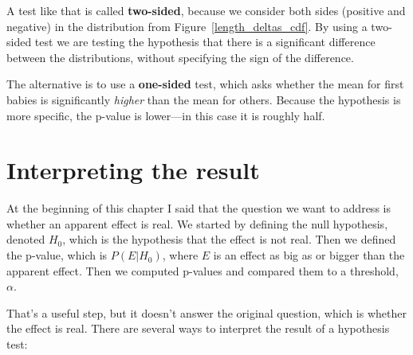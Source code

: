 \documentclass[12pt]{book}
\begin{document}

A test like that is called {\bf two-sided}, because we consider both
sides (positive and negative) in the distribution from
Figure~\ref{length_deltas_cdf}.  By using a two-sided test we are
testing the hypothesis that there is a significant difference between
the distributions, without specifying the sign of the difference.


The alternative is to use a {\bf one-sided} test, which asks whether
the mean for first babies is significantly {\em higher} than
the mean for others.  Because the hypothesis is more specific, the
p-value is lower---in this case it is roughly half.


\section{Interpreting the result}

At the beginning of this chapter I said that the question we want to
address is whether an apparent effect is real.  We started by defining
the null hypothesis, denoted $H_0$, which is the
hypothesis that the effect is not real.  Then we defined the p-value,
which is $P(E | H_0)$, where $E$ is an effect as big as or bigger than
the apparent effect.  Then we computed p-values and compared
them to a threshold, $\alpha$.

That's a useful step, but it doesn't answer the original question,
which is whether the effect is real.  There are several ways to
interpret the result of a hypothesis test:
\end{document}
